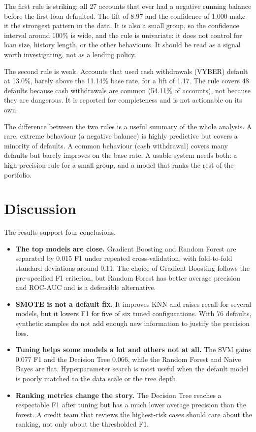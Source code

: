 The first rule is striking: all 27 accounts that ever had a negative running balance before the first loan defaulted. The lift of 8.97 and the confidence of 1.000 make it the strongest pattern in the data. It is also a small group, so the confidence interval around 100\% is wide, and the rule is univariate: it does not control for loan size, history length, or the other behaviours. It should be read as a signal worth investigating, not as a lending policy.

The second rule is weak. Accounts that used cash withdrawals (VYBER) default at 13.0\%, barely above the 11.14\% base rate, for a lift of 1.17. The rule covers 48 defaults because cash withdrawals are common (54.11\% of accounts), not because they are dangerous. It is reported for completeness and is not actionable on its own.

The difference between the two rules is a useful summary of the whole analysis. A rare, extreme behaviour (a negative balance) is highly predictive but covers a minority of defaults. A common behaviour (cash withdrawal) covers many defaults but barely improves on the base rate. A usable system needs both: a high-precision rule for a small group, and a model that ranks the rest of the portfolio.

\section{Discussion}
\label{sec:model-discussion}

The results support four conclusions.

\begin{itemize}
    \item \textbf{The top models are close.} Gradient Boosting and Random Forest are separated by 0.015 F1 under repeated cross-validation, with fold-to-fold standard deviations around 0.11. The choice of Gradient Boosting follows the pre-specified F1 criterion, but Random Forest has better average precision and ROC-AUC and is a defensible alternative.
    \item \textbf{SMOTE is not a default fix.} It improves KNN and raises recall for several models, but it lowers F1 for five of six tuned configurations. With 76 defaults, synthetic samples do not add enough new information to justify the precision loss.
    \item \textbf{Tuning helps some models a lot and others not at all.} The SVM gains 0.077 F1 and the Decision Tree 0.066, while the Random Forest and Naive Bayes are flat. Hyperparameter search is most useful when the default model is poorly matched to the data scale or the tree depth.
    \item \textbf{Ranking metrics change the story.} The Decision Tree reaches a respectable F1 after tuning but has a much lower average precision than the forest. A credit team that reviews the highest-risk cases should care about the ranking, not only about the thresholded F1.
\end{itemize}

